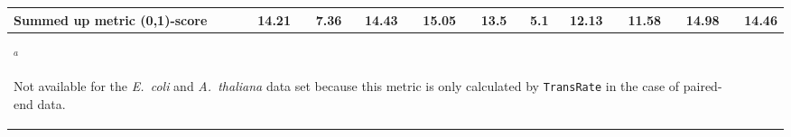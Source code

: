 \documentclass{scrartcl}
\begin{document}
\begin{landscape}
\begin{table}
\begin{scriptsize}
\begin{tabular}{llllllllllll}
\multicolumn{2}{l}{\textbf{Summed up metric (0,1)-score}}&14.21&7.36&14.43&15.05&13.5&5.1&12.13&11.58&14.98&14.46\\\bottomrule
\multicolumn{11}{l}{$^{a}$\begin{scriptsize}Not available for the \emph{E.~coli} and \emph{A.~thaliana} data set because this metric is only calculated by \texttt{TransRate} in the case of paired-end data.\end{scriptsize}}\\\end{tabular}\end{scriptsize}
\end{table}
\end{landscape}
\end{document}
